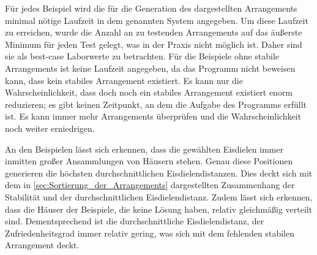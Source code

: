 \documentclass[a4paper,10pt,ngerman,captions=figureheading]{scrartcl}
\begin{document}
Für jedes Beispiel wird die für die Generation des dargestellten Arrangements minimal nötige Laufzeit in dem genannten System angegeben.
Um diese Laufzeit zu erreichen, wurde die Anzahl an zu testenden Arrangements auf das äußerste Minimum für jeden Test gelegt, was in der Praxis nicht möglich ist.
Daher sind sie als best-case Laborwerte zu betrachten.
Für die Beispiele ohne stabile Arrangements ist keine Laufzeit angegeben, da das Programm nicht beweisen kann, dass kein stabiles Arrangement existiert.
Es kann nur die Wahrscheinlichkeit, dass doch noch ein stabiles Arrangement existiert enorm reduzieren; es gibt keinen Zeitpunkt, an dem die Aufgabe des Programms erfüllt ist.
Es kann immer mehr Arrangements überprüfen und die Wahrscheinlichkeit noch weiter erniedrigen.

An den Beispielen lässt sich erkennen, dass die gewählten Eisdielen immer inmitten großer Ansammlungen von Häusern stehen.
Genau diese Positionen generieren die höchsten durchschnittlichen Eisdielendistanzen.
Dies deckt sich mit dem in \autoref{sec:Sortierung_der_Arrangements} dargestellten Zusammenhang der Stabilität und der durchschnittlichen Eisdielendistanz.
Zudem lässt sich erkennen, dass die Häuser der Beispiele, die keine Lösung haben, relativ gleichmäßig verteilt sind.
Dementsprechend ist die durchschnittliche Eisdielendistanz, der \glqq Zufriedenheitsgrad\grqq{} immer relativ gering, was sich mit dem fehlenden stabilen Arrangement deckt.
\end{document}
